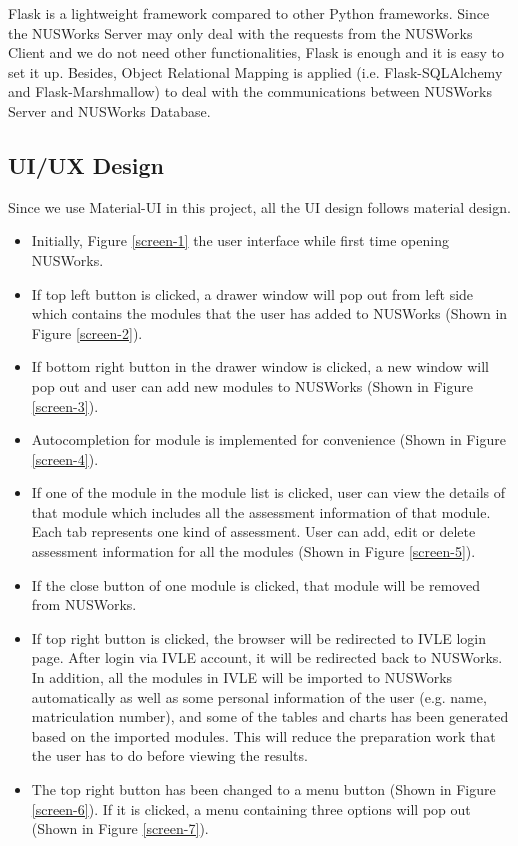 \documentclass[fyp]{socreport}
\begin{document}
Flask is a lightweight framework compared to other Python frameworks. Since the NUSWorks Server may only deal with the requests from the NUSWorks Client and we do not need other functionalities, Flask is enough and it is easy to set it up. Besides, Object Relational Mapping is applied (i.e. Flask-SQLAlchemy and Flask-Marshmallow) to deal with the communications between NUSWorks Server and NUSWorks Database.

\subsection{UI/UX Design}
Since we use Material-UI in this project, all the UI design follows material design.
\begin{itemize}
	\item Initially, Figure {\ref{screen-1}} the user interface while first time opening NUSWorks.
	\item If top left button is clicked, a drawer window will pop out from left side which contains the modules that the user has added to NUSWorks (Shown in Figure {\ref{screen-2}}).
	\item If bottom right button in the drawer window is clicked, a new window will pop out and user can add new modules to NUSWorks (Shown in Figure {\ref{screen-3}}).
	\item Autocompletion for module is implemented for convenience (Shown in Figure {\ref{screen-4}}).
	\item If one of the module in the module list is clicked, user can view the details of that module which includes all the assessment information of that module. Each tab represents one kind of assessment. User can add, edit or delete assessment information for all the modules (Shown in Figure {\ref{screen-5}}).
	\item If the close button of one module is clicked, that module will be removed from NUSWorks.
	\item If top right button is clicked, the browser will be redirected to IVLE login page. After login via IVLE account, it will be redirected back to NUSWorks. In addition, all the modules in IVLE will be imported to NUSWorks automatically as well as some personal information of the user (e.g. name, matriculation number), and some of the tables and charts has been generated based on the imported modules. This will reduce the preparation work that the user has to do before viewing the results.
	\item The top right button has been changed to a menu button (Shown in Figure {\ref{screen-6}}). If it is clicked, a menu containing three options will pop out (Shown in Figure {\ref{screen-7}}).

\end{itemize}
\end{document}

